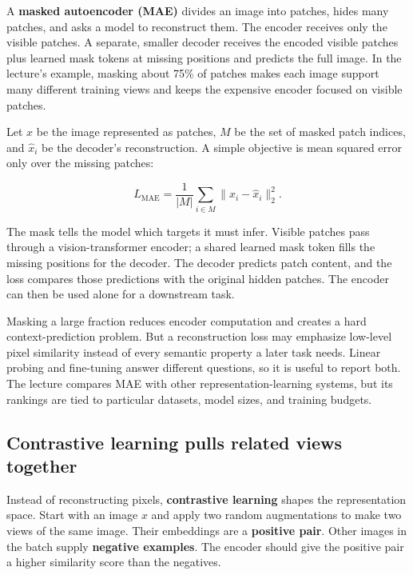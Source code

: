 \hypertarget{04-visual-computing-ii-ch031-masked-autoencoders-predict-hidden-patches}{}

A \textbf{masked autoencoder (MAE)} divides an image into patches, hides many patches, and asks a model to reconstruct them. The encoder receives only the visible patches. A separate, smaller decoder receives the encoded visible patches plus learned mask tokens at missing positions and predicts the full image. In the lecture's example, masking about 75\% of patches makes each image support many different training views and keeps the expensive encoder focused on visible patches.

Let \(x\) be the image represented as patches, \(M\) be the set of masked patch indices, and \(\hat{x}_i\) be the decoder's reconstruction. A simple objective is mean squared error only over the missing patches:

\[
L_{\text{MAE}}=\frac{1}{|M|}\sum_{i\in M}\|x_i-\hat{x}_i\|_2^2.
\]

The mask tells the model which targets it must infer. Visible patches pass through a vision-transformer encoder; a shared learned mask token fills the missing positions for the decoder. The decoder predicts patch content, and the loss compares those predictions with the original hidden patches. The encoder can then be used alone for a downstream task.

Masking a large fraction reduces encoder computation and creates a hard context-prediction problem. But a reconstruction loss may emphasize low-level pixel similarity instead of every semantic property a later task needs. Linear probing and fine-tuning answer different questions, so it is useful to report both. The lecture compares MAE with other representation-learning systems, but its rankings are tied to particular datasets, model sizes, and training budgets.

\subsection{Contrastive learning pulls related views together}\label{04-visual-computing-ii-ch031-contrastive-learning-pulls-related-views-together}

\hypertarget{04-visual-computing-ii-ch031-contrastive-learning-pulls-related-views-together}{}

Instead of reconstructing pixels, \textbf{contrastive learning} shapes the representation space. Start with an image \(x\) and apply two random augmentations to make two views of the same image. Their embeddings are a \textbf{positive pair}. Other images in the batch supply \textbf{negative examples}. The encoder should give the positive pair a higher similarity score than the negatives.

